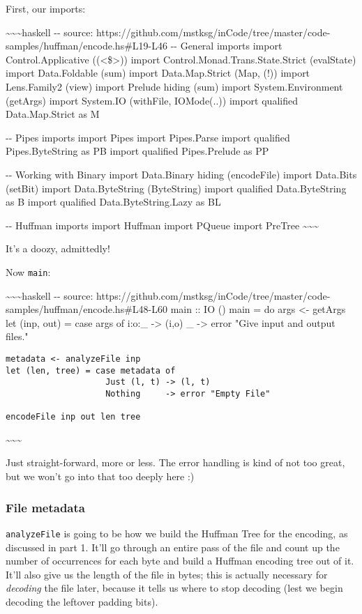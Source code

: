 \documentclass[]{article}
\begin{document}
First, our imports:

\textasciitilde{}\textasciitilde{}\textasciitilde{}haskell -\/- source:
https://github.com/mstksg/inCode/tree/master/code-samples/huffman/encode.hs\#L19-L46
-\/- General imports import Control.Applicative ((\textless{}\$\textgreater{}))
import Control.Monad.Trans.State.Strict (evalState) import Data.Foldable (sum)
import Data.Map.Strict (Map, (!)) import Lens.Family2 (view) import Prelude
hiding (sum) import System.Environment (getArgs) import System.IO (withFile,
IOMode(..)) import qualified Data.Map.Strict as M

-\/- Pipes imports import Pipes import Pipes.Parse import qualified
Pipes.ByteString as PB import qualified Pipes.Prelude as PP

-\/- Working with Binary import Data.Binary hiding (encodeFile) import Data.Bits
(setBit) import Data.ByteString (ByteString) import qualified Data.ByteString as
B import qualified Data.ByteString.Lazy as BL

-\/- Huffman imports import Huffman import PQueue import PreTree
\textasciitilde{}\textasciitilde{}\textasciitilde{}

It's a doozy, admittedly!

Now \texttt{main}:

\textasciitilde{}\textasciitilde{}\textasciitilde{}haskell -\/- source:
https://github.com/mstksg/inCode/tree/master/code-samples/huffman/encode.hs\#L48-L60
main :: IO () main = do args \textless{}- getArgs let (inp, out) = case args of
i:o:\_ -\textgreater{} (i,o) \_ -\textgreater{} error "Give input and output
files."

\begin{verbatim}
metadata <- analyzeFile inp
let (len, tree) = case metadata of
                    Just (l, t) -> (l, t)
                    Nothing     -> error "Empty File"

encodeFile inp out len tree
\end{verbatim}

\textasciitilde{}\textasciitilde{}\textasciitilde{}

Just straight-forward, more or less. The error handling is kind of not too
great, but we won't go into that too deeply here :)

\subsubsection{File metadata}

\texttt{analyzeFile} is going to be how we build the Huffman Tree for the
encoding, as discussed in part 1. It'll go through an entire pass of the file
and count up the number of occurrences for each byte and build a Huffman
encoding tree out of it. It'll also give us the length of the file in bytes;
this is actually necessary for \emph{decoding} the file later, because it tells
us where to stop decoding (lest we begin decoding the leftover padding bits).
\end{document}
